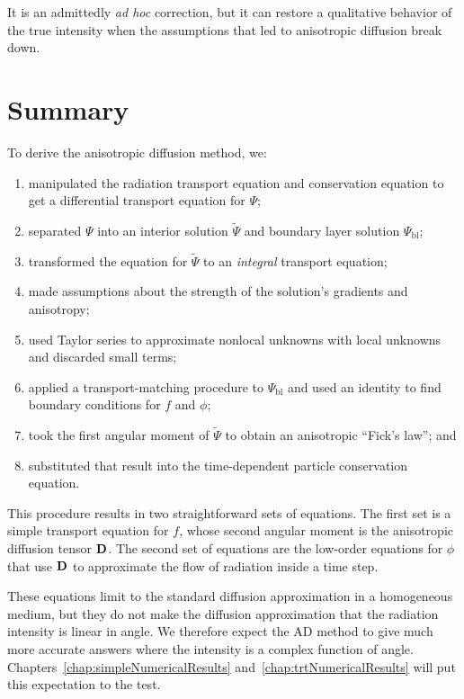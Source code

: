 It is an admittedly \emph{ad hoc} correction, but it can restore a qualitative
behavior of the true intensity when the assumptions that led to anisotropic
diffusion break down.

\section{Summary}
To derive the anisotropic diffusion method, we:
\begin{enumerate}
  \item manipulated the radiation transport equation and conservation equation
    to get a differential transport equation for $\Psi$;
  \item separated $\Psi$ into an interior solution $\tilde \Psi$ and boundary
    layer solution $\Psi_\mathrm{bl}$;
  \item transformed the equation for $\tilde \Psi$ to an \emph{integral}
    transport equation;
  \item made assumptions about the strength of the solution's gradients and
    anisotropy;
  \item used Taylor series to approximate nonlocal unknowns with local
    unknowns and discarded small terms;
  \item applied a transport-matching procedure to $\Psi_\mathrm{bl}$ 
    and used an identity to find boundary conditions for $f$ and $\phi$;
  \item took the first angular moment of $\tilde \Psi$ to obtain an anisotropic
    ``Fick's law''; and
  \item substituted that result into the time-dependent particle conservation
    equation.
\end{enumerate}
This procedure results in two straightforward sets of equations. The first set
is a simple transport equation for $f$, whose second angular moment is
the anisotropic diffusion tensor $\mathbf{D}$. The second set of equations are the
low-order equations for $\phi$ that use $\mathbf{D}$ to approximate the flow of
radiation inside a time step. 

These equations limit to the standard diffusion approximation in a homogeneous
medium, but they do not make the diffusion approximation that the radiation
intensity is linear in
angle. We therefore expect the AD method to give much more accurate answers
where the intensity is a complex function of angle.
Chapters~\ref{chap:simpleNumericalResults}
and~\ref{chap:trtNumericalResults} will put this expectation to the test.


